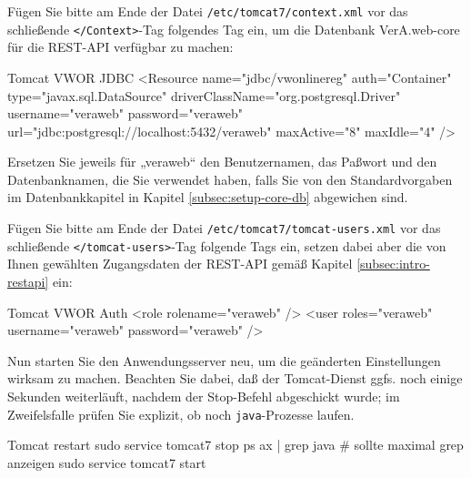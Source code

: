 \begin{minipage}{\textwidth}
Fügen Sie bitte am Ende der Datei \texttt{/etc/tomcat7/context.xml} vor
das schließende \texttt{</Context>}-Tag folgendes Tag ein, um die
 \ifupgradeanleitung
  Datenbank VerA.web-core
 \else%
 \fi%
für die REST-API verfügbar zu machen:

\begin{lstdump}[language=XML]{Tomcat VWOR JDBC}
<Resource name="jdbc/vwonlinereg" auth="Container" type="javax.sql.DataSource"
 driverClassName="org.postgresql.Driver" username="veraweb" password="veraweb"
 url="jdbc:postgresql://localhost:5432/veraweb" maxActive="8" maxIdle="4" />
\end{lstdump}

Ersetzen Sie jeweils für „veraweb“ den Benutzernamen, das Paßwort und den
Datenbanknamen, die Sie verwendet haben, falls Sie von den Standardvorgaben
 \ifupgradeanleitung
  im Datenbankkapitel
 \else%
  in Kapitel \ref{subsec:setup-core-db}
 \fi%
abgewichen sind.
\end{minipage}

\begin{minipage}{\textwidth}
Fügen Sie bitte am Ende der Datei \texttt{/etc/tomcat7/tomcat-users.xml} vor
das schließende \texttt{</tomcat-users>}-Tag folgende Tags ein, setzen dabei
aber die von Ihnen gewählten Zugangsdaten der REST-API gemäß Kapitel
\ref{subsec:intro-restapi} ein:

\begin{lstdump}[language=XML]{Tomcat VWOR Auth}
<role rolename="veraweb" />
<user roles="veraweb" username="veraweb" password="veraweb" />
\end{lstdump}
\end{minipage}

Nun starten Sie den Anwendungsserver neu, um die geänderten
Einstellungen wirksam zu machen. Beachten Sie dabei, daß der
Tomcat-Dienst ggfs. noch einige Sekunden weiterläuft, nachdem
der Stop-Befehl abgeschickt wurde; im Zweifelsfalle prüfen Sie
explizit, ob noch \texttt{java}-Prozesse laufen.\keinumbruch

\begin{minipage}{\textwidth}
\begin{lstdump}{Tomcat restart}
sudo service tomcat7 stop
ps ax | grep java # sollte maximal grep anzeigen
sudo service tomcat7 start
\end{lstdump}
\end{minipage}

